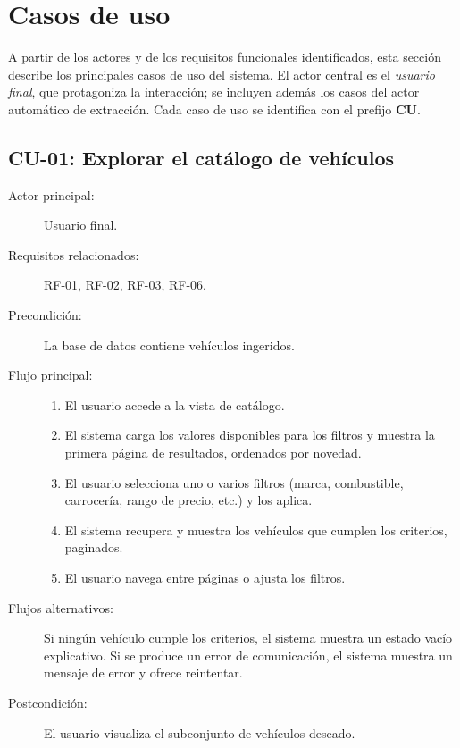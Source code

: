 \section{Casos de uso}
\label{sec:req-casos-uso}

A partir de los actores y de los requisitos funcionales identificados, esta
sección describe los principales casos de uso del sistema. El actor central es
el \emph{usuario final}, que protagoniza la interacción; se incluyen además los
casos del actor automático de extracción. Cada caso de uso se identifica con el
prefijo \textbf{CU}.

\subsection{CU-01: Explorar el catálogo de vehículos}

\begin{description}
  \item[Actor principal:] Usuario final.
  \item[Requisitos relacionados:] RF-01, RF-02, RF-03, RF-06.
  \item[Precondición:] La base de datos contiene vehículos ingeridos.
  \item[Flujo principal:]
        \begin{enumerate}
          \item El usuario accede a la vista de catálogo.
          \item El sistema carga los valores disponibles para los filtros y
                muestra la primera página de resultados, ordenados por novedad.
          \item El usuario selecciona uno o varios filtros (marca, combustible,
                carrocería, rango de precio, etc.) y los aplica.
          \item El sistema recupera y muestra los vehículos que cumplen los
                criterios, paginados.
          \item El usuario navega entre páginas o ajusta los filtros.
        \end{enumerate}
  \item[Flujos alternativos:] Si ningún vehículo cumple los criterios, el
        sistema muestra un estado vacío explicativo. Si se produce un error de
        comunicación, el sistema muestra un mensaje de error y ofrece reintentar.
  \item[Postcondición:] El usuario visualiza el subconjunto de vehículos
        deseado.
\end{description}

